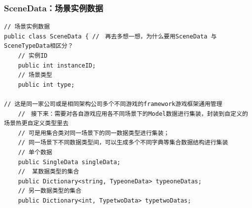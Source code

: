 \documentclass[9pt, b5paper]{article}
\begin{document}
\subsubsection{SceneData：场景实例数据}
\label{sec-10-1-1}
\begin{verbatim}
// 场景实例数据
public class SceneData { //　再去多想一想，为什么要用SceneData 与SceneTypeData相区分？
    // 实例ID
    public int instanceID;
    // 场景类型
    public int type;

// 这是同一家公司或是相同架构公司多个不同游戏的framework游戏框架通用管理
    //　接下来：需要对各自游戏应用各不同场景下的Model数据进行集装，封装到自定义的场景热更自定义类型里去
    // 可是用集合类对同一场景下的同一数据类型进行集装；
    // 同一场景下不同数据类型间，可以生成多个不同字典等集合数据结构进行集装
    // 单个数据
    public SingleData singleData;
    //  某数据类型的集合
    public Dictionary<string, TypeoneData> typeoneDatas;
    // 另一数据类型的集合
    public Dictionary<int, TypetwoData> typetwoDatas;


\end{verbatim}
\end{document}
